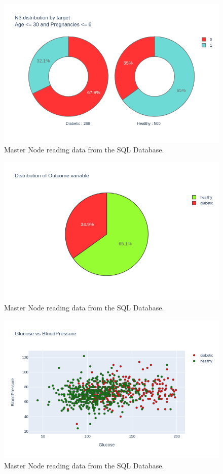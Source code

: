 \documentclass[12pt]{article}
\begin{document}
\begin{figure}[ht]
\centering
\includegraphics[width=1\textwidth]{newplot(19).png}
\caption{Master Node reading data from the SQL Database.}
\end{figure}

\begin{figure}[ht]
\centering
\includegraphics[width=1\textwidth]{newplot(1).png}
\caption{Master Node reading data from the SQL Database.}
\end{figure}

\begin{figure}[ht]
\centering
\includegraphics[width=1\textwidth]{newplot(20).png}
\caption{Master Node reading data from the SQL Database.}
\end{figure}
\end{document}
